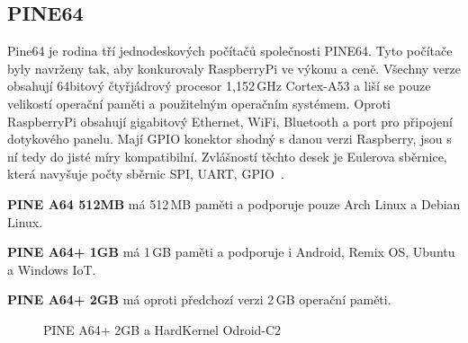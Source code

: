 	\subsection{PINE64}
Pine64 je rodina tří jednodeskových počítačů společnosti PINE64. Tyto počítače byly navrženy tak, aby konkurovaly RaspberryPi ve výkonu a ceně. Všechny verze obsahují 64bitový čtyřjádrový procesor 1,152\,GHz Cortex-A53 a liší se pouze velikostí operační paměti a použitelným operačním systémem. Oproti RaspberryPi obsahují gigabitový Ethernet, WiFi, Bluetooth a port pro připojení dotykového panelu. Mají GPIO konektor shodný s danou verzi Raspberry, jsou s ní tedy do jisté míry kompatibilní. Zvlášností těchto desek je Eulerova sběrnice, která navyšuje počty sběrnic SPI, UART, GPIO~\cite{Pine64}.

\textbf{PINE A64 512MB} má 512\,MB paměti a podporuje pouze Arch Linux a Debian Linux.

\textbf{PINE A64+ 1GB} má 1\,GB paměti a podporuje i Android, Remix OS, Ubuntu a Windows IoT.

\textbf{PINE A64+ 2GB} má oproti předchozí verzi 2\,GB operační paměti.

	\begin{figure}[!ht]
	\vspace{-10pt}
    \centering
			\hspace*{5mm}
			\caption{PINE A64+ 2GB a HardKernel Odroid-C2}
			\vspace{-10pt}
\end{figure}

